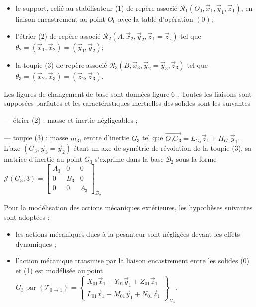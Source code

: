 \begin{itemize}
  \item le support, relié au stabilisateur (1) de repère associé $\mathcal{R}_{1}\left(O_{0}, \vec{x}_{1}, \vec{y}_{1}, \vec{z}_{1}\right)$, en liaison encastrement au point $O_{0}$ avec la table d'opération $(0)$;

  \item l'étrier (2) de repère associé $\mathcal{R}_{2}\left(A, \vec{x}_{2}, \vec{y}_{2}, \vec{z}_{1}=\vec{z}_{2}\right)$ tel que $\theta_{2}=\left(\vec{x}_{1}, \vec{x}_{2}\right)=\left(\vec{y}_{1}, \vec{y}_{2}\right)$;

  \item la toupie (3) de repère associé $\mathcal{R}_{3}\left(B, \vec{x}_{3}, \vec{y}_{2}=\vec{y}_{3}, \vec{z}_{3}\right)$ tel que $\theta_{3}=\left(\vec{x}_{2}, \vec{x}_{3}\right)=\left(\vec{z}_{2}, \vec{z}_{3}\right)$.

\end{itemize}

Les figures de changement de base sont données figure 6 . Toutes les liaisons sont supposées parfaites et les caractéristiques inertielles des solides sont les suivantes

— étrier (2) : masse et inertie négligeables ;

— toupie (3) : masse $m_{3}$, centre d'inertie $G_{3}$ tel que $\overrightarrow{O_{0} G_{3}}=L_{G_{3}} \vec{z}_{1}+H_{G_{3}} \vec{y}_{1}$. L'axe $\left(G_{3}, \vec{y}_{3}=\vec{y}_{2}\right)$ étant un axe de symétrie de révolution de la toupie (3), sa matrice d'inertie au point $G_{3}$ s'exprime dans la base $\mathcal{B}_{2}$ sous la forme $\mathcal{J}\left(G_{3}, 3\right)=\left[\begin{array}{ccc}A_{3} & 0 & 0 \\ 0 & B_{3} & 0 \\ 0 & 0 & A_{3}\end{array}\right]_{\mathcal{B}_{2}}$

Pour la modélisation des actions mécaniques extérieures, les hypothèses suivantes sont adoptées :

\begin{itemize}
  \item les actions mécaniques dues à la pesanteur sont négligées devant les effets dynamiques ;

  \item l'action mécanique transmise par la liaison encastrement entre les solides (0) et (1) est modélisée au point $G_{3} \operatorname{par}\left\{\mathcal{T}_{0 \rightarrow 1}\right\}=\left\{\begin{array}{c}X_{01} \vec{x}_{1}+Y_{01} \vec{y}_{1}+Z_{01} \vec{z}_{1} \\ L_{01} \vec{x}_{1}+M_{01} \vec{y}_{1}+N_{01} \vec{z}_{1}\end{array}\right\}_{G_{3}}$.

\end{itemize}

